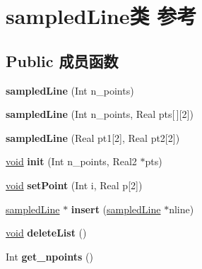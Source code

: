 \hypertarget{classsampled_line}{}\section{sampled\+Line类 参考}
\label{classsampled_line}
\subsection*{Public 成员函数}
\begin{DoxyCompactItemize}
\item 
\mbox{\label{classsampled_line_a16b392a648471beae82e487d6cf0ca69}} 
{\bfseries sampled\+Line} (Int n\+\_\+points)
\item 
\mbox{\label{classsampled_line_a90981ece642c44b770aeb55d63be90e2}} 
{\bfseries sampled\+Line} (Int n\+\_\+points, Real pts\mbox{[}$\,$\mbox{]}\mbox{[}2\mbox{]})
\item 
\mbox{\label{classsampled_line_a4531b74ad917eebdda3c655c7ca0a8d8}} 
{\bfseries sampled\+Line} (Real pt1\mbox{[}2\mbox{]}, Real pt2\mbox{[}2\mbox{]})
\item 
\mbox{\label{classsampled_line_a1b8c7b6a1fc7f4d7449b47e6aa410b4a}} 
\hyperlink{interfacevoid}{void} {\bfseries init} (Int n\+\_\+points, Real2 $\ast$pts)
\item 
\mbox{\label{classsampled_line_a72c6fe2341668234a0432ff8138eccb4}} 
\hyperlink{interfacevoid}{void} {\bfseries set\+Point} (Int i, Real p\mbox{[}2\mbox{]})
\item 
\mbox{\label{classsampled_line_a4fae07a531e7c6b217d23ff3b171d19c}} 
\hyperlink{classsampled_line}{sampled\+Line} $\ast$ {\bfseries insert} (\hyperlink{classsampled_line}{sampled\+Line} $\ast$nline)
\item 
\mbox{\label{classsampled_line_ae845113fde7b6f6eb52bf7d2d6a1fb6e}} 
\hyperlink{interfacevoid}{void} {\bfseries delete\+List} ()
\item 
\mbox{\label{classsampled_line_a7c7b80a68b6cd632b4d46130ba297f7d}} 
Int {\bfseries get\+\_\+npoints} ()

\end{DoxyCompactItemize}

